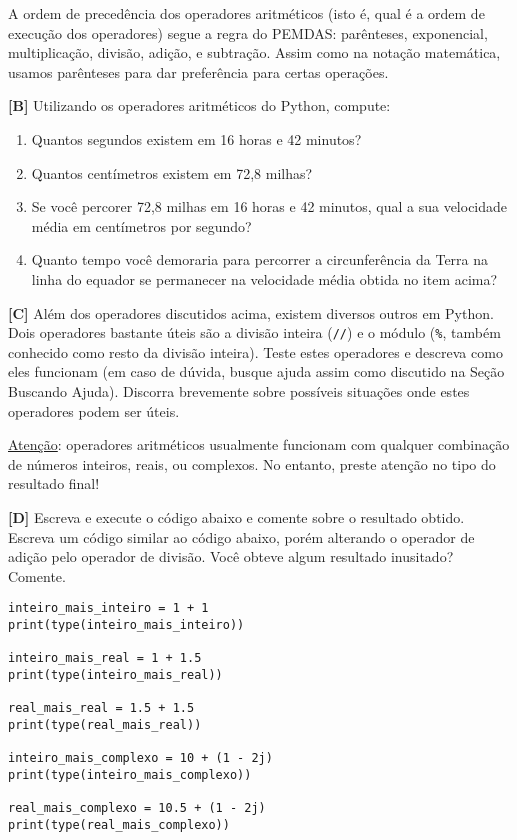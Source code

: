 \documentclass[11pt]{article}
\begin{document}
A ordem de precedência dos operadores aritméticos (isto é, qual é a ordem de execução dos operadores) segue a regra do PEMDAS: parênteses, exponencial, multiplicação, divisão, adição, e subtração. Assim como na notação matemática, usamos parênteses para dar preferência para certas operações.

\textbf{[B]} Utilizando os operadores aritméticos do Python, compute:
\begin{enumerate}
\item Quantos segundos existem em 16 horas e 42 minutos?
\item Quantos centímetros existem em 72,8 milhas?
\item Se você percorer 72,8 milhas em 16 horas e 42 minutos, qual a sua velocidade média em centímetros por segundo?
\item Quanto tempo você demoraria para percorrer a circunferência da Terra na linha do equador se permanecer na velocidade média obtida no item acima?
\end{enumerate}

\textbf{[C]} Além dos operadores discutidos acima, existem diversos outros em Python. Dois operadores bastante úteis são a divisão inteira (\texttt{//}) e o módulo (\texttt{\%}, também conhecido como resto da divisão inteira). Teste estes operadores e descreva como eles funcionam (em caso de dúvida, busque ajuda assim como discutido na Seção Buscando Ajuda). Discorra brevemente sobre possíveis situações onde estes operadores podem ser úteis.

\uline{Atenção}: operadores aritméticos usualmente funcionam com qualquer combinação de números inteiros, reais, ou complexos. No entanto, preste atenção no tipo do resultado final!

\textbf{[D]} Escreva e execute o código abaixo e comente sobre o resultado obtido. Escreva um código similar ao código abaixo, porém alterando o operador de adição pelo operador de divisão. Você obteve algum resultado inusitado? Comente.

\begin{verbatim}
inteiro_mais_inteiro = 1 + 1
print(type(inteiro_mais_inteiro))

inteiro_mais_real = 1 + 1.5
print(type(inteiro_mais_real))

real_mais_real = 1.5 + 1.5
print(type(real_mais_real))

inteiro_mais_complexo = 10 + (1 - 2j)
print(type(inteiro_mais_complexo))

real_mais_complexo = 10.5 + (1 - 2j)
print(type(real_mais_complexo))
\end{verbatim}
\end{document}
